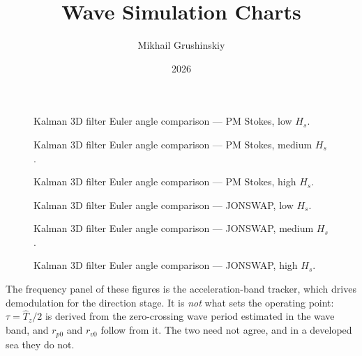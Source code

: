 \documentclass[11pt,letterpaper]{article}
\title{Wave Simulation Charts}
\author{Mikhail Grushinskiy}
\date{2026}
\begin{document}
    \maketitle



    \begin{figure}[H]\centering
    \resizebox{\textwidth}{!}{}
    \caption{Kalman 3D filter Euler angle comparison — PM Stokes, low $H_s$.}
    \label{fig:w3d_ou2_pmstokes_low}
    \end{figure}

    \begin{figure}[H]\centering
    \resizebox{\textwidth}{!}{}
    \caption{Kalman 3D filter Euler angle comparison — PM Stokes, medium $H_s$.}
    \label{fig:w3d_ou2_pmstokes_medium}
    \end{figure}

    \begin{figure}[H]\centering
    \resizebox{\textwidth}{!}{}
    \caption{Kalman 3D filter Euler angle comparison — PM Stokes, high $H_s$.}
    \label{fig:w3d_ou2_pmstokes_high}
    \end{figure}

    \begin{figure}[H]\centering
    \resizebox{\textwidth}{!}{}
    \caption{Kalman 3D filter Euler angle comparison — JONSWAP, low $H_s$.}
    \label{fig:w3d_ou2_jonswap_low}
    \end{figure}

    \begin{figure}[H]\centering
    \resizebox{\textwidth}{!}{}
    \caption{Kalman 3D filter Euler angle comparison — JONSWAP, medium $H_s$.}
    \label{fig:w3d_ou2_jonswap_medium}
    \end{figure}

    \begin{figure}[H]\centering
    \resizebox{\textwidth}{!}{}
    \caption{Kalman 3D filter Euler angle comparison — JONSWAP, high $H_s$.}
    \label{fig:w3d_ou2_jonswap_high}
    \end{figure}



The frequency panel of these figures is the acceleration-band tracker, which
drives demodulation for the direction stage. It is \emph{not} what sets the
operating point: $\tau=\widehat{T}_z/2$ is derived from the zero-crossing wave
period estimated in the wave band, and $r_{p0}$ and $r_{v0}$ follow from it. The
two need not agree, and in a developed sea they do not.
\end{document}
